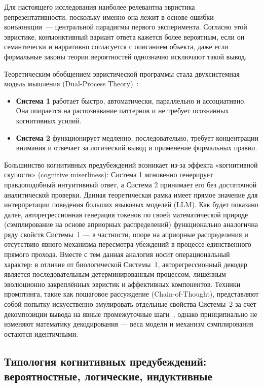 Для настоящего исследования наиболее релевантна эвристика репрезентативности, поскольку именно она лежит в основе ошибки конъюнкции~--- центральной парадигмы первого эксперимента. Согласно этой эвристике, конъюнктивный вариант ответа кажется более вероятным, если он семантически и нарративно согласуется с описанием объекта, даже если формальные законы теории вероятностей однозначно исключают такой вывод.

Теоретическим обобщением эвристической программы стала двухсистемная модель мышления (Dual-Process Theory)~\cite{evans2003in, kahneman2011thinking}: 
\begin{itemize}
    \item \textbf{Система 1} работает быстро, автоматически, параллельно и ассоциативно. Она опирается на распознавание паттернов и не требует осознанных когнитивных усилий.
    \item \textbf{Система 2} функционирует медленно, последовательно, требует концентрации внимания и отвечает за логический вывод и применение формальных правил.
\end{itemize}

Большинство когнитивных предубеждений возникает из-за эффекта «когнитивной скупости» (cognitive miserliness): Система 1 мгновенно генерирует правдоподобный интуитивный ответ, а Система 2 принимает его без достаточной аналитической проверки. Данная теоретическая рамка имеет прямое значение для интерпретации поведения больших языковых моделей (LLM). Как будет показано далее, авторегрессионная генерация токенов по своей математической природе (сэмплирование на основе априорных распределений) функционально аналогична ряду свойств Системы~1 --- в частности, опоре на априорные распределения и отсутствию явного механизма пересмотра убеждений в процессе единственного прямого прохода. Вместе с тем данная аналогия носит операциональный характер: в отличие от биологической Системы~1, авторегрессионный декодер является последовательным детерминированным процессом, лишённым эволюционно закреплённых эвристик и аффективных компонентов. Техники промптинга, такие как пошаговое рассуждение (Chain-of-Thought), представляют собой попытку искусственно эмулировать отдельные свойства Системы~2 за счёт декомпозиции вывода на явные промежуточные шаги~\cite{wei2022chain}, однако принципиально не изменяют математику декодирования --- веса модели и механизм сэмплирования остаются идентичными.

\subsection{Типология когнитивных предубеждений: вероятностные, логические, индуктивные}

